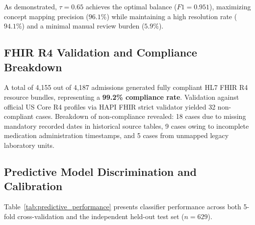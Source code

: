 \documentclass[11pt,a4paper]{article}
\begin{document}
\begin{table}[h!]
\centering
\caption{\textbf{Sensitivity Analysis of BioWordVec Cosine Similarity Threshold ($\tau$) on EpSO Concept Resolution and Precision.}}
\label{tab:sensitivity}
\end{table}

As demonstrated, $\tau = 0.65$ achieves the optimal balance ($F1 = 0.951$), maximizing concept mapping precision ($96.1\%$) while maintaining a high resolution rate ($94.1\%$) and a minimal manual review burden ($5.9\%$).

\subsection{FHIR R4 Validation and Compliance Breakdown}
A total of 4,155 out of 4,187 admissions generated fully compliant HL7 FHIR R4 resource bundles, representing a \textbf{99.2\% compliance rate}. Validation against official US Core R4 profiles via HAPI FHIR strict validator yielded 32 non-compliant cases. Breakdown of non-compliance revealed: 18 cases due to missing mandatory recorded dates in historical source tables, 9 cases owing to incomplete medication administration timestamps, and 5 cases from unmapped legacy laboratory units.

\subsection{Predictive Model Discrimination and Calibration}
Table~\ref{tab:predictive_performance} presents classifier performance across both 5-fold cross-validation and the independent held-out test set ($n = 629$).
\end{document}
